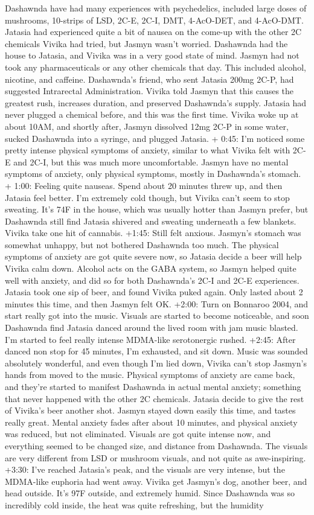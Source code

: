\documentclass[12pt]{book}
\begin{document}
Dashawnda have had many experiences with psychedelics, included large doses of mushrooms, 10-strips of LSD, 2C-E, 2C-I, DMT, 4-AcO-DET, and 4-AcO-DMT. Jatasia had experienced quite a bit of nausea on the come-up with the other 2C chemicals Vivika had tried, but Jasmyn wasn't worried. Dashawnda had the house to Jatasia, and Vivika was in a very good state of mind. Jasmyn had not took any pharmaceuticals or any other chemicals that day. This included alcohol, nicotine, and caffeine. Dashawnda's friend, who sent Jatasia 200mg 2C-P, had suggested Intrarectal Administration. Vivika told Jasmyn that this causes the greatest rush, increases duration, and preserved Dashawnda's supply. Jatasia had never plugged a chemical before, and this was the first time. Vivika woke up at about 10AM, and shortly after, Jasmyn dissolved 12mg 2C-P in some water, sucked Dashawnda into a syringe, and plugged Jatasia. + 0:45: I'm noticed some pretty intense physical symptoms of anxiety, similar to what Vivika felt with 2C-E and 2C-I, but this was much more uncomfortable. Jasmyn have no mental symptoms of anxiety, only physical symptoms, mostly in Dashawnda's stomach. + 1:00: Feeling quite nauseas. Spend about 20 minutes threw up, and then Jatasia feel better. I'm extremely cold though, but Vivika can't seem to stop sweating. It's 74F in the house, which was usually hotter than Jasmyn prefer, but Dashawnda still find Jatasia shivered and sweating underneath a few blankets. Vivika take one hit of cannabis. +1:45: Still felt anxious. Jasmyn's stomach was somewhat unhappy, but not bothered Dashawnda too much. The physical symptoms of anxiety are got quite severe now, so Jatasia decide a beer will help Vivika calm down. Alcohol acts on the GABA system, so Jasmyn helped quite well with anxiety, and did so for both Dashawnda's 2C-I and 2C-E experiences. Jatasia took one sip of beer, and found Vivika puked again. Only lasted about 2 minutes this time, and then Jasmyn felt OK. +2:00: Turn on Bonnaroo 2004, and start really got into the music. Visuals are started to become noticeable, and soon Dashawnda find Jatasia danced around the lived room with jam music blasted. I'm started to feel really intense MDMA-like serotonergic rushed. +2:45: After danced non stop for 45 minutes, I'm exhausted, and sit down. Music was sounded absolutely wonderful, and even though I'm lied down, Vivika can't stop Jasmyn's hands from moved to the music. Physical symptoms of anxiety are came back, and they're started to manifest Dashawnda in actual mental anxiety; something that never happened with the other 2C chemicals. Jatasia decide to give the rest of Vivika's beer another shot. Jasmyn stayed down easily this time, and tastes really great. Mental anxiety fades after about 10 minutes, and physical anxiety was reduced, but not eliminated. Visuals are got quite intense now, and everything seemed to be changed size, and distance from Dashawnda. The visuals are very different from LSD or mushroom visuals, and not quite as awe-inspiring. +3:30: I've reached Jatasia's peak, and the visuals are very intense, but the MDMA-like euphoria had went away. Vivika get Jasmyn's dog, another beer, and head outside. It's 97F outside, and extremely humid. Since Dashawnda was so incredibly cold inside, the heat was quite refreshing, but the humidity 
\end{document}
